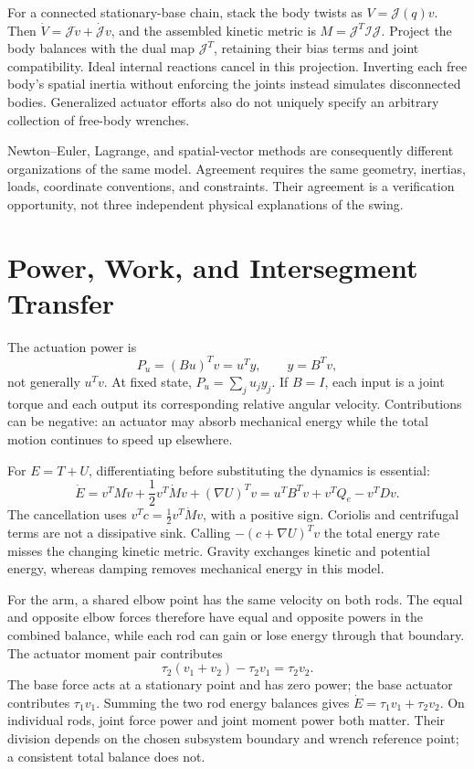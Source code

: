 For a connected stationary-base chain, stack the body twists as $V=\mathcal J(q)v$. Then $\dot V=\mathcal J\dot v+\dot{\mathcal J}v$, and the assembled kinetic metric is $M=\mathcal J^T\mathcal I\mathcal J$. Project the body balances with the dual map $\mathcal J^T$, retaining their bias terms and joint compatibility. Ideal internal reactions cancel in this projection. Inverting each free body's spatial inertia without enforcing the joints instead simulates disconnected bodies. Generalized actuator efforts also do not uniquely specify an arbitrary collection of free-body wrenches.

Newton--Euler, Lagrange, and spatial-vector methods are consequently different organizations of the same model. Agreement requires the same geometry, inertias, loads, coordinate conventions, and constraints. Their agreement is a verification opportunity, not three independent physical explanations of the swing.

\section{Power, Work, and Intersegment Transfer}

The actuation power is
\begin{equation}
P_u=(Bu)^Tv=u^Ty,\qquad y=B^Tv,
\label{eq:ch3:power-superposition}
\end{equation}
not generally $u^Tv$. At fixed state, $P_u=\sum_j u_jy_j$. If $B=I$, each input is a joint torque and each output its corresponding relative angular velocity. Contributions can be negative: an actuator may absorb mechanical energy while the total motion continues to speed up elsewhere.

For $E=T+U$, differentiating before substituting the dynamics is essential:
\begin{equation}
\dot E=v^TM\dot v+\frac12v^T\dot Mv+(\nabla U)^Tv
=u^TB^Tv+v^TQ_e-v^TDv.
\label{eq:ch3:energy-passivity}
\end{equation}
The cancellation uses $v^Tc=\tfrac12v^T\dot Mv$, with a positive sign. Coriolis and centrifugal terms are not a dissipative sink. Calling $-(c+\nabla U)^Tv$ the total energy rate misses the changing kinetic metric. Gravity exchanges kinetic and potential energy, whereas damping removes mechanical energy in this model.

For the arm, a shared elbow point has the same velocity on both rods. The equal and opposite elbow forces therefore have equal and opposite powers in the combined balance, while each rod can gain or lose energy through that boundary. The actuator moment pair contributes
\begin{equation}
\tau_2(v_1+v_2)-\tau_2v_1=\tau_2v_2.
\end{equation}
The base force acts at a stationary point and has zero power; the base actuator contributes $\tau_1v_1$. Summing the two rod energy balances gives $\dot E=\tau_1v_1+\tau_2v_2$. On individual rods, joint force power and joint moment power both matter. Their division depends on the chosen subsystem boundary and wrench reference point; a consistent total balance does not.

